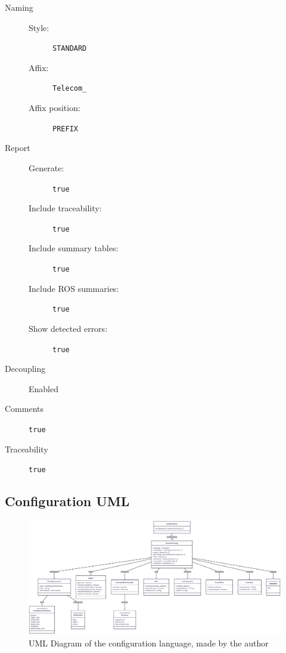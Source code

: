 \begin{description}
	\item[Naming]
	\begin{description}
		\item[Style:] \texttt{STANDARD}
		\item[Affix:] \texttt{Telecom\_}
		\item[Affix position:] \texttt{PREFIX}
	\end{description}
	
	\item[Report]
	\begin{description}
		\item[Generate:] \texttt{true}
		\item[Include traceability:] \texttt{true}
		\item[Include summary tables:] \texttt{true}
		\item[Include ROS summaries:] \texttt{true}
		\item[Show detected errors:] \texttt{true}
	\end{description}
	
	\item[Decoupling] Enabled
	
	\item[Comments] \texttt{true}
	
	\item[Traceability] \texttt{true}
\end{description}


\subsection{Configuration UML}

\begin{figure}[htbp]
	\centering
	\includegraphics[width=\textwidth]{configLanguageUML.png}
	\caption{UML Diagram of the configuration language, made by the author}
	\label{figapp:configLanguageUML}
\end{figure}

